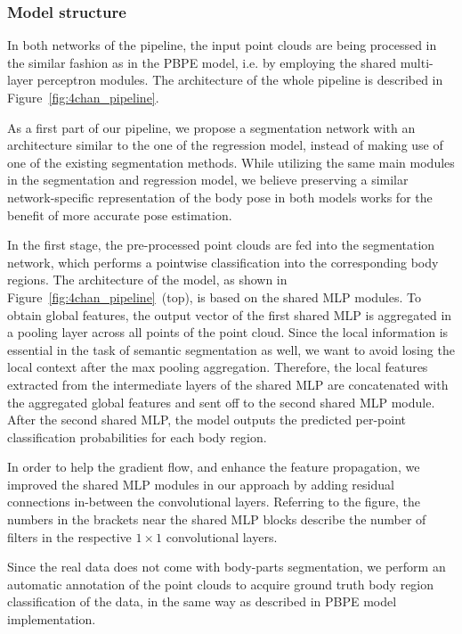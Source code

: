 \subsubsection{Model structure}
In both networks of the pipeline, the input point clouds are being processed in the similar fashion as in the PBPE model, i.e. by employing the shared multi-layer perceptron modules. The architecture of the whole pipeline is described in Figure~\ref{fig:4chan_pipeline}.\par
\vspace{5mm}
\noindent 
As a first part of our pipeline, we propose a segmentation network with an architecture similar to the one of the regression model, instead of making use of one of the existing segmentation methods. While utilizing the same main modules in the segmentation and regression model, we believe preserving a similar network-specific representation of the body pose in both models works for the benefit of more accurate pose estimation.\par
\vspace{5mm}
\noindent In the first stage, the pre-processed point clouds are fed into the segmentation network, which performs a pointwise classification into the corresponding body regions. The architecture of the model, as shown in Figure~\ref{fig:4chan_pipeline}~(top), is based on the shared MLP modules. To obtain global features, the output vector of the first shared MLP is aggregated in a pooling layer across all points of the point cloud. Since the local information is essential in the task of semantic segmentation as well, we want to avoid losing the local context after the max pooling aggregation. Therefore, the local features extracted from the intermediate layers of the shared MLP are concatenated with the aggregated global features and sent off to the second shared MLP module. After the second shared MLP, the model outputs the predicted per-point classification probabilities for each body region.\par
\vspace{5mm}
\noindent In order to help the gradient flow, and enhance the feature propagation, we improved the shared MLP modules in our approach by adding residual connections in-between the convolutional layers. Referring to the figure, the numbers in the brackets near the shared MLP blocks describe the number of filters in the respective $1 \times 1$ convolutional layers.\par
\vspace{5mm}
\noindent Since the real data does not come with body-parts segmentation, we perform an automatic annotation of the point clouds to acquire ground truth body region classification of the data, in the same way as described in PBPE model implementation.\par


